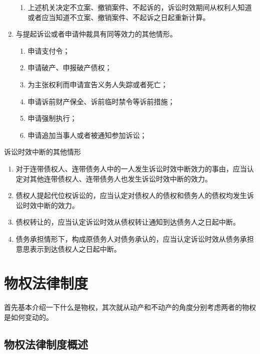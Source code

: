 \documentclass[UTF8,12pt]{ctexart}
\numberwithin{equation}{section} %
\numberwithin{figure}{section}
\numberwithin{table}{section}
\begin{document}
\begin{enumerate}
\begin{enumerate}
			\item 上述机关决定不立案、撤销案件、不起诉的，诉讼时效期间从权利人知道或者应当知道不立案、撤销案件、不起诉之日起重新计算。
		\end{enumerate}
	
		
		\item 与提起诉讼或者申请仲裁具有同等效力的其他情形。
		\begin{enumerate}
			\item 申请支付令；
			
			\item 申请破产、申报破产债权；
			
			\item 为主张权利而申请宣告义务人失踪或者死亡；
			
			\item 申请诉前财产保全、诉前临时禁令等诉前措施；
			
			\item 申请强制执行；
			
			\item 申请追加当事人或者被通知参加诉讼；
		\end{enumerate}
	\end{enumerate}
	
	诉讼时效中断的其他情形
	\begin{enumerate}
		\item 对于连带债权人、连带债务人中的一人发生诉讼时效中断效力的事由，应当认定对其他连带债权人、连带债务人也发生诉讼时效中断的效力。
		
		\item 债权人提起代位权诉讼的，应当认定对债权人的债权和债务人的债权均发生诉讼时效中断的效力。
		
		\item 债权转让的，应当认定诉讼时效从债权转让通知到达债务人之日起中断。
		
		\item 债务承担情形下，构成原债务人对债务承认的，应当认定诉讼时效从债务承担意思表示到达债权人之日起中断。
	\end{enumerate}
	
	\newpage
	
	\section{物权法律制度}
	
	首先基本介绍一下什么是物权，其次就从动产和不动产的角度分别考虑两者的物权是如何变动的。
	
	\subsection{物权法律制度概述}
\end{document}
